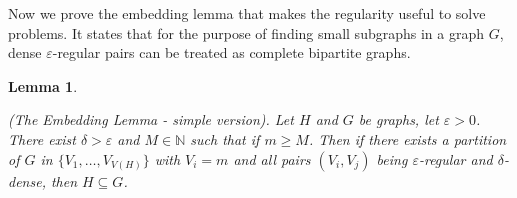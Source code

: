 \documentclass[12pt,twoside,a4paper,bibliography=totocnumbered]{book}
\numberwithin{equation}{section}
\newtheorem{lemma}     	[theorem] {Lemma}
\newtheorem{definition}	[theorem] {Definition}
\theoremstyle{remark}
\begin{document}
Now we prove the embedding lemma that makes the regularity useful to solve problems. It states that for the purpose of finding small subgraphs in a graph $G$, dense $\varepsilon$-regular pairs can be treated as complete bipartite graphs.


\begin{lemma}\label{lemma:embeddinglemma}


(The Embedding Lemma - simple version). Let $H$ and $G$ be graphs, let $\varepsilon > 0$. There exist $\delta >\varepsilon$ and $M \in \mathbb{N}$ such that if $m \geq M$. Then if there exists a partition of $G$ in $\{V_1, \ldots, V_{V(H)}\}$ with $V_i = m $ and all pairs $(V_i,V_j)$ being $\varepsilon$-regular and $\delta$-dense, then $H \subseteq G$. 
\end{lemma} 
\end{document}

